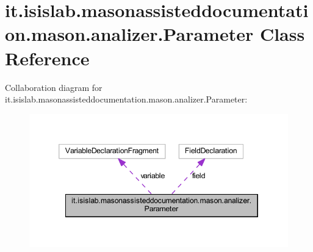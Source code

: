 \hypertarget{classit_1_1isislab_1_1masonassisteddocumentation_1_1mason_1_1analizer_1_1_parameter}{\section{it.\-isislab.\-masonassisteddocumentation.\-mason.\-analizer.\-Parameter Class Reference}
\label{classit_1_1isislab_1_1masonassisteddocumentation_1_1mason_1_1analizer_1_1_parameter}
}


Collaboration diagram for it.\-isislab.\-masonassisteddocumentation.\-mason.\-analizer.\-Parameter\-:
\nopagebreak
\begin{figure}[H]
\begin{center}
\leavevmode
\includegraphics[width=346pt]{classit_1_1isislab_1_1masonassisteddocumentation_1_1mason_1_1analizer_1_1_parameter__coll__graph}
\end{center}
\end{figure}
